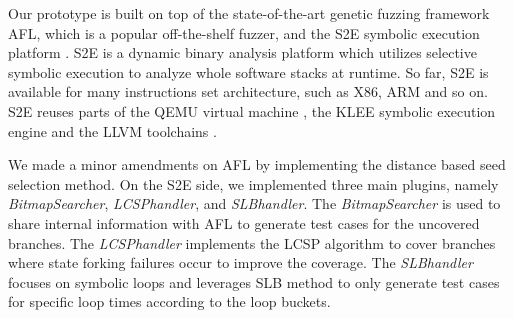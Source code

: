 Our prototype is built on top of the state-of-the-art genetic fuzzing framework AFL, which is a popular off-the-shelf fuzzer, and the S2E symbolic execution platform \cite{chipounov2011s2e}. S2E is a dynamic binary analysis platform which utilizes selective symbolic execution to analyze whole software stacks at runtime. So far, S2E is available for many instructions set architecture, such as X86, ARM and so on. S2E reuses parts of the QEMU virtual machine \cite{bellard2005qemu}, the KLEE symbolic execution engine \cite{cadar2008klee} and the LLVM toolchains \cite{lattner2004llvm}.

We made a minor amendments on AFL by implementing the distance based seed selection method. On the S2E side, we implemented three main plugins, namely \textit{BitmapSearcher}, \textit{LCSPhandler}, and \textit{SLBhandler}. The \textit{BitmapSearcher} is used to share internal information with AFL to generate test cases for the uncovered branches. The \textit{LCSPhandler} implements the LCSP algorithm to cover branches where state forking failures occur to improve the coverage. The \textit{SLBhandler} focuses on symbolic loops and leverages SLB method to only generate test cases for specific loop times according to the loop buckets. 
